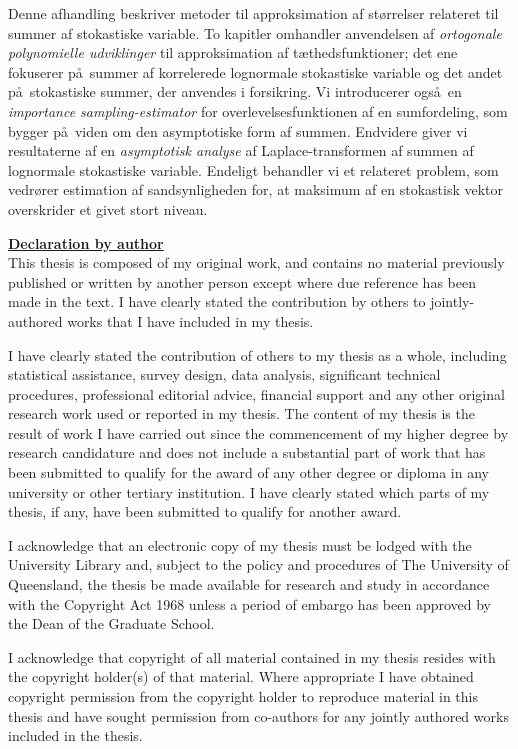 Denne afhandling beskriver metoder til approksimation af st\o rrelser relateret til summer af stokastiske variable. To kapitler omhandler anvendelsen af \emph {ortogonale polynomielle udviklinger} til approksimation af t\ae thedsfunktioner; det ene fokuserer p\aa\ summer af korrelerede lognormale stokastiske variable og det andet p\aa\ stokastiske summer, der anvendes i forsikring.
Vi introducerer ogs\aa\ en \emph{importance sampling-estimator} for overlevelsesfunktionen af en sumfordeling, som bygger p\aa\ viden om den asymptotiske form af summen.
Endvidere giver vi resultaterne af en \emph {asymptotisk analyse}
af Laplace-transformen af summen af lognormale stokastiske variable. Endeligt behandler vi et relateret problem, som vedr\o rer estimation af sandsynligheden for, at maksimum af en stokastisk vektor overskrider et givet stort niveau.


\newpage
{\bf \underline{Declaration by author}} \\

This thesis is composed of my original work, and contains no material
previously published or written by another person except where due reference
has been made in the text. I have clearly stated the contribution by others to
jointly-authored works that I have included in my thesis.

I have clearly stated the contribution of others to my thesis as a whole,
including statistical assistance, survey design, data analysis, significant
technical procedures, professional editorial advice, financial support and any other original
research work used or reported in my thesis. The content of my thesis is the
result of work I have carried out since the commencement of my higher
degree by research candidature and does not include a substantial part of work
that has been submitted to qualify for the award of any other degree or diploma
in any university or other tertiary institution. I have clearly stated which parts
of my thesis, if any, have been submitted to qualify for another award.

I acknowledge that an electronic copy of my thesis must be lodged with the
University Library and, subject to the policy and procedures of The University
of Queensland, the thesis be made available for research and study in accordance
with the Copyright Act 1968 unless a period of embargo has been approved by the
Dean of the Graduate School.

I acknowledge that copyright of all material contained in my thesis resides with
the copyright holder(s) of that material. Where appropriate I have obtained
copyright permission from the copyright holder to reproduce material in this
thesis and have sought permission from co-authors for any jointly authored works
included in the thesis.


